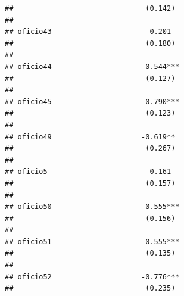 \documentclass[
]{article}
\begin{document}
\begin{verbatim}
##                               (0.142)                                                               
##                                                                                                     
## oficio43                      -0.201                                                                
##                               (0.180)                                                               
##                                                                                                     
## oficio44                     -0.544***                                                              
##                               (0.127)                                                               
##                                                                                                     
## oficio45                     -0.790***                                                              
##                               (0.123)                                                               
##                                                                                                     
## oficio49                     -0.619**                                                               
##                               (0.267)                                                               
##                                                                                                     
## oficio5                       -0.161                                                                
##                               (0.157)                                                               
##                                                                                                     
## oficio50                     -0.555***                                                              
##                               (0.156)                                                               
##                                                                                                     
## oficio51                     -0.555***                                                              
##                               (0.135)                                                               
##                                                                                                     
## oficio52                     -0.776***                                                              
##                               (0.235)                                                               

\end{verbatim}
\end{document}
